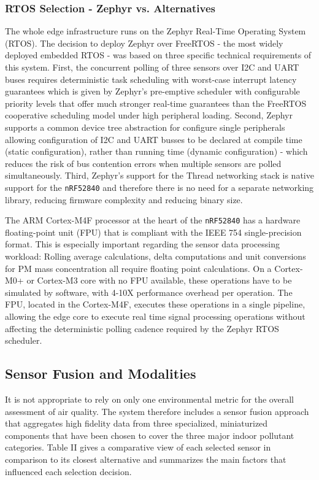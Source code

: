 \documentclass[conference]{IEEEtran}
\begin{document}
\subsubsection{RTOS Selection - Zephyr vs. Alternatives}

The whole edge infrastructure runs on the Zephyr Real-Time Operating System (RTOS). The decision to deploy Zephyr over FreeRTOS - the most widely deployed embedded RTOS - was based on three specific technical requirements of this system. First, the concurrent polling of three sensors over I2C and UART buses requires deterministic task scheduling with worst-case interrupt latency guarantees which is given by Zephyr's pre-emptive scheduler with configurable priority levels that offer much stronger real-time guarantees than the FreeRTOS cooperative scheduling model under high peripheral loading. Second, Zephyr supports a common device tree abstraction for configure single peripherals allowing configuration of I2C and UART busses to be declared at compile time (static configuration), rather than running time (dynamic configuration) - which reduces the risk of bus contention errors when multiple sensors are polled simultaneously. Third, Zephyr's support for the Thread networking stack is native support for the \texttt{nRF52840} and therefore there is no need for a separate networking library, reducing firmware complexity and reducing binary size.

The ARM Cortex-M4F processor at the heart of the \texttt{nRF52840} has a hardware floating-point unit (FPU) that is compliant with the IEEE 754 single-precision format. This is especially important regarding the sensor data processing workload: Rolling average calculations, delta computations and unit conversions for PM mass concentration all require floating point calculations. On a Cortex-M0+ or Cortex-M3 core with no FPU available, these operations have to be simulated by software, with 4-10X performance overhead per operation. The FPU, located in the Cortex-M4F, executes these operations in a single pipeline, allowing the edge core to execute real time signal processing operations without affecting the deterministic polling cadence required by the Zephyr RTOS scheduler.

\subsection{Sensor Fusion and Modalities}

It is not appropriate to rely on only one environmental metric for the overall assessment of air quality. The system therefore includes a sensor fusion approach that aggregates high fidelity data from three specialized, miniaturized components that have been chosen to cover the three major indoor pollutant categories. Table II gives a comparative view of each selected sensor in comparison to its closest alternative and summarizes the main factors that influenced each selection decision.
\end{document}
